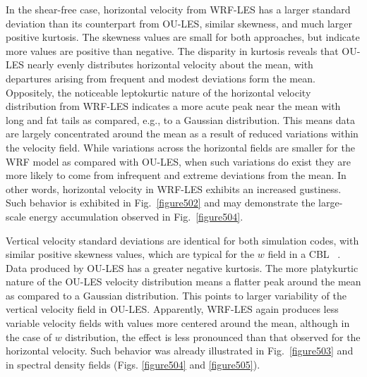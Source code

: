In the shear-free case, horizontal velocity from WRF-LES has a larger standard deviation than its counterpart from OU-LES, similar skewness, and much larger positive kurtosis. The skewness values are small for both approaches, but indicate more values are positive than negative. The disparity in kurtosis reveals that OU-LES nearly evenly distributes horizontal velocity about the mean, with departures arising from frequent and modest deviations form the mean. Oppositely, the noticeable leptokurtic nature of the horizontal velocity distribution from WRF-LES indicates a more acute peak near the mean with long and fat tails as compared, e.g., to a Gaussian distribution. This means data are largely concentrated around the mean as a result of reduced variations within the velocity field. While variations across the horizontal fields are smaller for the WRF model as compared with OU-LES, when such variations do exist they are more likely to come from infrequent and extreme deviations from the mean. In other words, horizontal velocity in WRF-LES exhibits an increased gustiness. Such behavior is exhibited in Fig.~\ref{figure502} and may demonstrate the large-scale energy accumulation observed in Fig.~\ref{figure504}.

Vertical velocity standard deviations are identical for both simulation codes, with similar positive skewness values, which are typical for the $w$ field in a CBL ~\citep{LeMone1990}. Data produced by OU-LES has a greater negative kurtosis. The more platykurtic nature of the OU-LES velocity distribution means a flatter peak around the mean as compared to a Gaussian distribution. This points to larger variability of the vertical velocity field in OU-LES. Apparently, WRF-LES again produces less variable velocity fields with values more centered around the mean, although in the case of $w$ distribution, the effect is less pronounced than that observed for the horizontal velocity. Such behavior was already illustrated in Fig.~\ref{figure503} and in spectral density fields (Figs. \autoref{figure504} and \autoref{figure505}).

